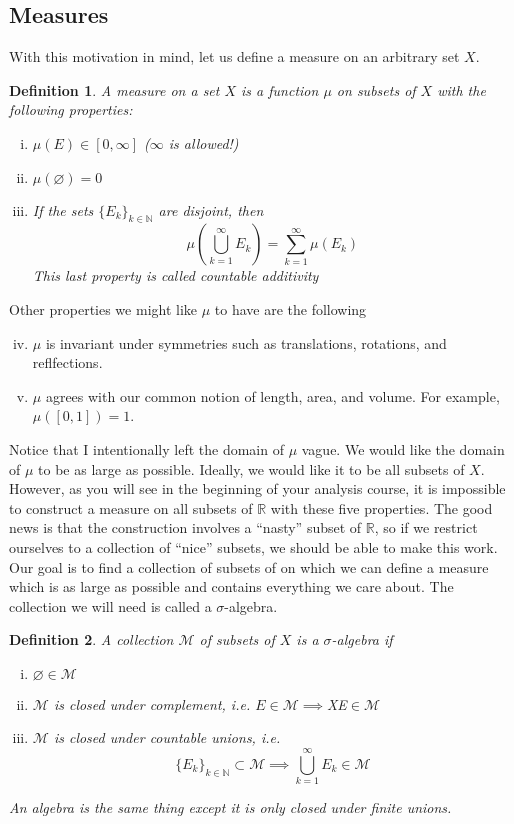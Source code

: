 \documentclass[10pt]{article}         %
\newtheorem{definition}{Definition}[section]
\theoremstyle{remark}
\newcommand{\N}{\mathbb{N}}
\newcommand{\R}{\mathbb{R}}
\begin{document}
\subsection{Measures}

With this motivation in mind, let us define a measure on an arbitrary set $X$.

\begin{definition}A \emph{measure} on a set $X$ is a function $\mu$ on subsets of $X$ with the following properties:
\begin{enumerate}[(i)]
\item $\mu(E) \in [0, \infty]$ ($\infty$ is allowed!)
\item $\mu(\varnothing) = 0$
\item If the sets $\{E_k\}_{k \in \N}$ are disjoint, then 
	\begin{equation}
	\mu \left( \bigcup_{k=1}^\infty E_k \right) = \sum_{k=1}^\infty \mu(E_k)
	\end{equation}
	This last property is called \emph{countable additivity}
\end{enumerate}
\end{definition}

Other properties we might like $\mu$ to have are the following
\begin{enumerate}[(i)]\setcounter{enumi}{3}
\item $\mu$ is invariant under symmetries such as translations, rotations, and reflfections.
\item $\mu$ agrees with our common notion of length, area, and volume. For example, $\mu([0,1]) = 1$.
\end{enumerate}

Notice that I intentionally left the domain of $\mu$ vague. We would like the domain of $\mu$ to be as large as possible. Ideally, we would like it to be all subsets of $X$. However, as you will see in the beginning of your analysis course, it is impossible to construct a measure on all subsets of $\R$ with these five properties. The good news is that the construction involves a ``nasty'' subset of $\R$, so if we restrict ourselves to a collection of ``nice'' subsets, we should be able to make this work. Our goal is to find a collection of subsets of on which we can define a measure which is as large as possible and contains everything we care about. The collection we will need is called a $\sigma$-algebra.

\begin{definition}A collection $\mathcal{M}$ of subsets of $X$ is a \emph{$\sigma$-algebra} if 
\begin{enumerate}[(i)]
	\item $\varnothing \in \mathcal{M}$ 
	\item $\mathcal{M}$ is closed under complement, i.e. $E \in \mathcal{M} \implies $X\setminus E$ \in \mathcal{M}$
	\item $\mathcal{M}$ is closed under countable unions, i.e. 
	\[
	\{E_k\}_{k \in \N} \subset \mathcal{M} \implies \bigcup_{k=1}^\infty E_k \in \mathcal{M} 
	\]
\end{enumerate}
An \emph{algebra} is the same thing except it is only closed under finite unions.
\end{definition}
\end{document}
